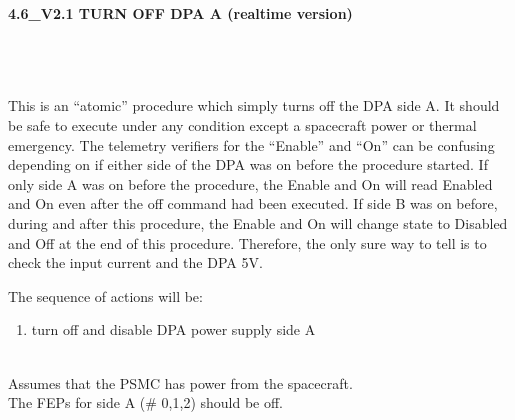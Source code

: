 \documentclass[11pt]{article}
\begin{document}
%
%
%
\newcommand{\be}{\begin{enumerate}}
\newcommand{\ee}{\end{enumerate}}
\newcommand{\bc}{\begin{center}}
\newcommand{\ec}{\end{center}}
\newcommand{\bi}{\begin{itemize}}
\newcommand{\ei}{\end{itemize}}
\newcommand{\bd}{\begin{description}}
\newcommand{\ed}{\end{description}}
\newcommand{\bt}{\begin{tabbing}}
\newcommand{\et}{\end{tabbing}}
\newcommand{\eg}{{\it e.g.~}}
\newcommand{\ie}{{\it i.e.~}}
\newcommand{\ul}{\underline}
\newcommand{\axaf}{{\em AXAF}}
\def\la{\hbox{\rlap{$<$}\lower0.5ex\hbox{$\sim$}\ }}


\large
\centerline {\bf 4.6\_V2.1 TURN OFF DPA A (realtime version) }
\vspace{0.25in}

\normalsize
{}\\
 \\


 \\
\normalsize
This is an ``atomic'' procedure which simply turns off the DPA side A.
It should be safe to execute under any
condition except a spacecraft power or thermal emergency.
The telemetry verifiers for the ``Enable'' and ``On''  can be
confusing depending on if either side of the DPA was on before the
procedure started.  If only side A was on before the procedure, the Enable and
On will read Enabled and On even after the off command had been
executed.  If side B was on before, during and after this procedure,
the Enable and On will change state to Disabled and Off at the end of
this procedure. Therefore, the only sure way to tell is to check the input
current and the DPA 5V.

\vspace{0.25in}
\noindent The sequence of actions will be:
\be
\item  turn off and disable DPA power supply side A
\ee


\vspace{0.15in}
\normalsize
{} \\
\normalsize
Assumes that the PSMC has power from the spacecraft. \\
The FEPs for side A (\# 0,1,2) should be off. \\
\end{document}
